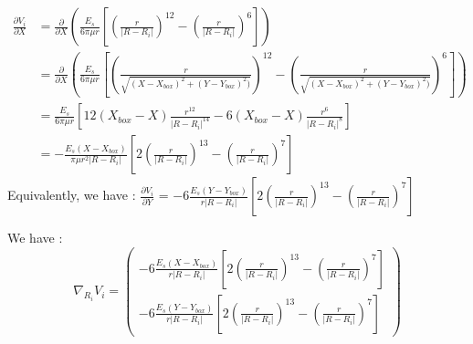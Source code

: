 \documentclass{article}
\begin{document}
\begin{align*}
    \frac{\partial V_i}{\partial X} &= \frac{\partial}{\partial X} \left( \frac{E_s}{6\pi\mu r} \left[ \left( \frac{r}{\lvert R - R_i \rvert} \right)^{12} - \left( \frac{r}{\lvert R - R_i \rvert} \right) ^6 \right] \right) \\
    &= \frac{\partial}{\partial X} \left( \frac{E_s}{6\pi\mu r} \left[ \left( \frac{r}{\sqrt{( X-X_{box})^2 + (Y-Y_{box})^2)}} \right)^{12} - \left( \frac{r}{\sqrt{( X-X_{box})^2 + (Y-Y_{box})^2)}} \right) ^6 \right] \right) \\
    &= \frac{E_s}{6\pi\mu r}\left[ 12(X_{box}-X)\frac{r^{12}}{\lvert R - R_i\rvert^{14}} - 6(X_{box}-X)\frac{r^6}{\lvert R-R_i\rvert^8} \right] \\
    &= -\frac{E_s (X-X_{box})}{\pi\mu r^2 \lvert R - R_i \rvert } \left[ 2 \left( \frac{r}{\lvert R-R_i\rvert} \right)^{13} - \left( \frac{r}{\lvert R-R_i\rvert}\right)^7 \right] 
\end{align*}
Equivalently, we have : $\frac{\partial V_i}{\partial Y}$ = $ -6 \frac{E_s (Y-Y_{box})}{r \lvert R - R_i \rvert } \left[ 2 \left( \frac{r}{\lvert R-R_i\rvert} \right)^{13} - \left( \frac{r}{\lvert R-R_i\rvert}\right)^7 \right]$

We have : 
\begin{equation*}
    \boxed{\nabla_{R_i} V_i = \begin{pmatrix}
        -6 \frac{E_s (X-X_{box})}{r \lvert R - R_i \rvert } \left[ 2 \left( \frac{r}{\lvert R-R_i\rvert} \right)^{13} - \left( \frac{r}{\lvert R-R_i\rvert}\right)^7 \right] \\
        -6 \frac{E_s (Y-Y_{box})}{r \lvert R - R_i \rvert } \left[ 2 \left( \frac{r}{\lvert R-R_i\rvert} \right)^{13} - \left( \frac{r}{\lvert R-R_i\rvert}\right)^7 \right]
    \end{pmatrix}}
\end{equation*}
\end{document}
